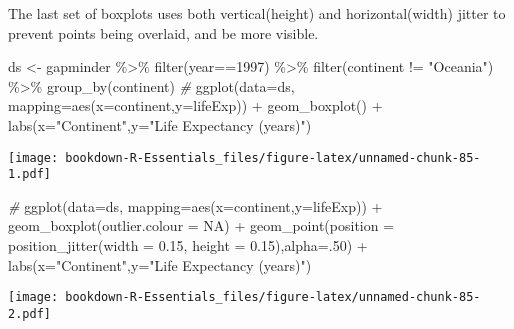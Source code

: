 \documentclass[
]{book}
\newenvironment{Shaded}{\begin{snugshade}}{\end{snugshade}}
\newcommand{\AttributeTok}[1]{\textcolor[rgb]{0.77,0.63,0.00}{#1}}
\newcommand{\CommentTok}[1]{\textcolor[rgb]{0.56,0.35,0.01}{\textit{#1}}}
\newcommand{\ConstantTok}[1]{\textcolor[rgb]{0.00,0.00,0.00}{#1}}
\newcommand{\DecValTok}[1]{\textcolor[rgb]{0.00,0.00,0.81}{#1}}
\newcommand{\FloatTok}[1]{\textcolor[rgb]{0.00,0.00,0.81}{#1}}
\newcommand{\FunctionTok}[1]{\textcolor[rgb]{0.00,0.00,0.00}{#1}}
\newcommand{\NormalTok}[1]{#1}
\newcommand{\OtherTok}[1]{\textcolor[rgb]{0.56,0.35,0.01}{#1}}
\newcommand{\SpecialCharTok}[1]{\textcolor[rgb]{0.00,0.00,0.00}{#1}}
\newcommand{\StringTok}[1]{\textcolor[rgb]{0.31,0.60,0.02}{#1}}
\begin{document}
The last set of boxplots uses both vertical(height) and horizontal(width) jitter to prevent points being overlaid, and be more visible.

\begin{Shaded}
\begin{Highlighting}[]
\NormalTok{ds }\OtherTok{\textless{}{-}}\NormalTok{ gapminder }\SpecialCharTok{\%\textgreater{}\%} 
  \FunctionTok{filter}\NormalTok{(year}\SpecialCharTok{==}\DecValTok{1997}\NormalTok{) }\SpecialCharTok{\%\textgreater{}\%} 
  \FunctionTok{filter}\NormalTok{(continent }\SpecialCharTok{!=} \StringTok{"Oceania"}\NormalTok{) }\SpecialCharTok{\%\textgreater{}\%} 
  \FunctionTok{group\_by}\NormalTok{(continent) }
\CommentTok{\#}
\FunctionTok{ggplot}\NormalTok{(}\AttributeTok{data=}\NormalTok{ds, }\AttributeTok{mapping=}\FunctionTok{aes}\NormalTok{(}\AttributeTok{x=}\NormalTok{continent,}\AttributeTok{y=}\NormalTok{lifeExp)) }\SpecialCharTok{+}
 \FunctionTok{geom\_boxplot}\NormalTok{() }\SpecialCharTok{+} 
  \FunctionTok{labs}\NormalTok{(}\AttributeTok{x=}\StringTok{"Continent"}\NormalTok{,}\AttributeTok{y=}\StringTok{"Life Expectancy (years)"}\NormalTok{)}
\end{Highlighting}
\end{Shaded}

\texttt{[image: bookdown-R-Essentials\_files/figure-latex/unnamed-chunk-85-1.pdf]}

\begin{Shaded}
\begin{Highlighting}[]
\CommentTok{\#}
\FunctionTok{ggplot}\NormalTok{(}\AttributeTok{data=}\NormalTok{ds, }\AttributeTok{mapping=}\FunctionTok{aes}\NormalTok{(}\AttributeTok{x=}\NormalTok{continent,}\AttributeTok{y=}\NormalTok{lifeExp)) }\SpecialCharTok{+}  
 \FunctionTok{geom\_boxplot}\NormalTok{(}\AttributeTok{outlier.colour =} \ConstantTok{NA}\NormalTok{) }\SpecialCharTok{+} 
 \FunctionTok{geom\_point}\NormalTok{(}\AttributeTok{position =} \FunctionTok{position\_jitter}\NormalTok{(}\AttributeTok{width =} \FloatTok{0.15}\NormalTok{, }\AttributeTok{height =} \FloatTok{0.15}\NormalTok{),}\AttributeTok{alpha=}\NormalTok{.}\DecValTok{50}\NormalTok{) }\SpecialCharTok{+}
  \FunctionTok{labs}\NormalTok{(}\AttributeTok{x=}\StringTok{"Continent"}\NormalTok{,}\AttributeTok{y=}\StringTok{"Life Expectancy (years)"}\NormalTok{)}
\end{Highlighting}
\end{Shaded}

\texttt{[image: bookdown-R-Essentials\_files/figure-latex/unnamed-chunk-85-2.pdf]}
\end{document}
